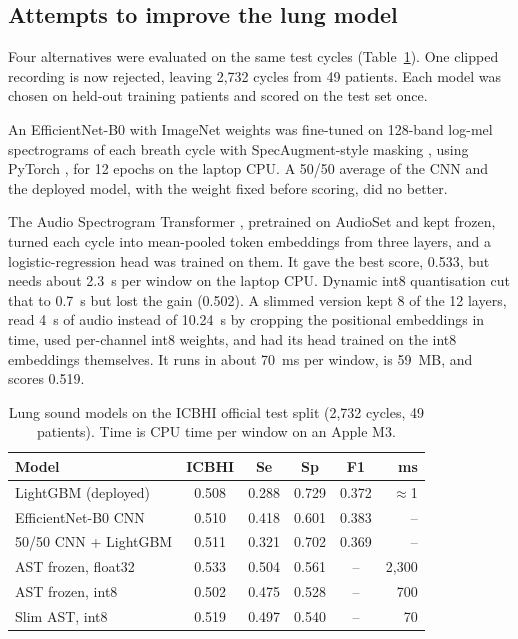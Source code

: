 \documentclass[conference]{IEEEtran}
\begin{document}
\subsection{Attempts to improve the lung model}
\label{sec:lungexp}
Four alternatives were evaluated on the same test cycles (Table~\ref{tab:cnn}). One clipped recording is now rejected, leaving 2{,}732 cycles from 49 patients. Each model was chosen on held-out training patients and scored on the test set once.

An EfficientNet-B0 \cite{tan2019} with ImageNet weights \cite{deng2009} was fine-tuned on 128-band log-mel spectrograms of each breath cycle with SpecAugment-style masking \cite{park2019}, using PyTorch \cite{paszke2019}, for 12 epochs on the laptop CPU. A 50/50 average of the CNN and the deployed model, with the weight fixed before scoring, did no better.

The Audio Spectrogram Transformer \cite{gong2021}, pretrained on AudioSet \cite{gemmeke2017} and kept frozen, turned each cycle into mean-pooled token embeddings from three layers, and a logistic-regression head was trained on them. It gave the best score, 0.533, but needs about 2.3~s per window on the laptop CPU. Dynamic int8 quantisation cut that to 0.7~s but lost the gain (0.502). A slimmed version kept 8 of the 12 layers, read 4~s of audio instead of 10.24~s by cropping the positional embeddings in time, used per-channel int8 weights, and had its head trained on the int8 embeddings themselves. It runs in about 70~ms per window, is 59~MB, and scores 0.519.

\begin{table}[t]
\caption{Lung sound models on the ICBHI official test split (2{,}732 cycles, 49 patients). Time is CPU time per window on an Apple M3.}
\label{tab:cnn}
\centering
\footnotesize
\begin{tabular}{@{}lccccr@{}}
\toprule
Model & ICBHI & Se & Sp & F1 & ms \\
\midrule
LightGBM (deployed) & 0.508 & 0.288 & 0.729 & 0.372 & $\approx$1 \\
EfficientNet-B0 CNN & 0.510 & 0.418 & 0.601 & 0.383 & -- \\
50/50 CNN + LightGBM & 0.511 & 0.321 & 0.702 & 0.369 & -- \\
AST frozen, float32 & 0.533 & 0.504 & 0.561 & -- & 2{,}300 \\
AST frozen, int8 & 0.502 & 0.475 & 0.528 & -- & 700 \\
Slim AST, int8 & 0.519 & 0.497 & 0.540 & -- & 70 \\
\bottomrule
\end{tabular}
\end{table}
\end{document}
